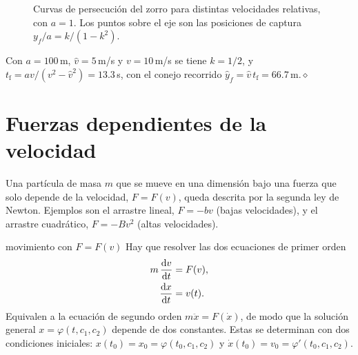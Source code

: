 \documentclass[11pt,twoside]{article}
\newcommand\vh{\hat v}
\newcommand\yhh{\hat y}
\newcommand\fin{\hfill\textcolor{muted}{$\diamond$}}
\newcommand\leyenda[2]{\textcolor{#1}{\rule[2.2pt]{11pt}{1.1pt}}\ #2}
\begin{document}
\begin{figure}[!htbp]
\centering
{}
\caption{Curvas de persecución del zorro para distintas velocidades relativas, con $a=1$. Los puntos sobre el eje son las
posiciones de captura $y_f/a=k/(1-k^2)$.}
\label{fig:persecucion}
\end{figure}

\begin{ejemplo}
Con $a=100$\,m, $\vh=5$\,m/s y $v=10$\,m/s se tiene $k=1/2$, y $t_{\mathrm f}=av/(v^2-\vh^2)=13.3$\,s, con el conejo
recorrido $\yhh_f=\vh\,t_{\mathrm f}=66.7$\,m.\fin
\end{ejemplo}

\section{Fuerzas dependientes de la velocidad}\label{sec:fuerzas}

Una partícula de masa $m$ que se mueve en una dimensión bajo una fuerza que solo depende de la velocidad, $F=F(v)$, queda
descrita por la segunda ley de Newton. Ejemplos son el arrastre lineal, $F=-bv$ (bajas velocidades), y el arrastre
cuadrático, $F=-Bv^2$ (altas velocidades).

\begin{modelo}{movimiento con $F=F(v)$}
Hay que resolver las dos ecuaciones de primer orden
\begin{align}
m\,\frac{\mathrm{d}v}{\mathrm{d}t}&=F(v),\label{eq:fv1}\\
\frac{\mathrm{d}x}{\mathrm{d}t}&=v(t).\label{eq:fv2}
\end{align}
Equivalen a la ecuación de segundo orden $m\ddot x=F(\dot x)$, de modo que la solución general $x=\varphi(t,c_1,c_2)$ depende
de dos constantes. Estas se determinan con dos condiciones iniciales: $x(t_0)=x_0=\varphi(t_0,c_1,c_2)$ y
$\dot x(t_0)=v_0=\varphi'(t_0,c_1,c_2)$.
\end{modelo}
\end{document}

